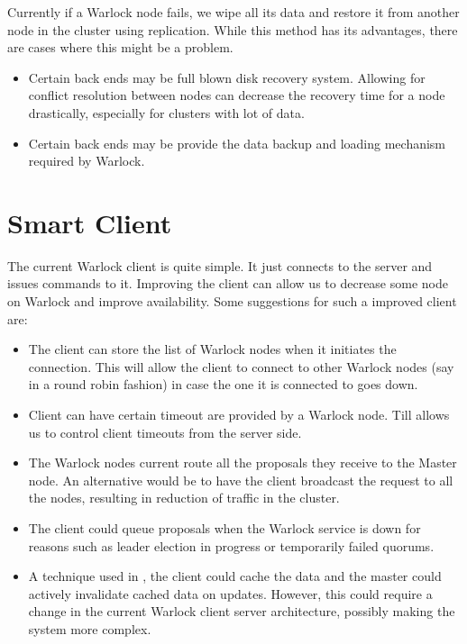 Currently if a Warlock node fails, we wipe all its data and restore it from
another node in the cluster using replication. While this method has its
advantages, there are cases where this might be a problem.

\begin{itemize}
  \item Certain back ends may be full blown disk recovery system. Allowing for
    conflict resolution between nodes can decrease the recovery time for a
    node drastically, especially for clusters with lot of data.
  \item Certain back ends may be provide the data backup and loading mechanism
    required by Warlock.
\end{itemize}

\section{Smart Client}

The current Warlock client is quite simple. It just connects to the server and
issues commands to it. Improving the client can allow us to decrease some
node on Warlock and improve availability. Some suggestions for such a improved
client are:

\begin{itemize}
  \item The client can store the list of Warlock nodes when it initiates the
    connection. This will allow the client to connect to other Warlock nodes
    (say in a round robin fashion) in case the one it is connected to goes down.
  \item Client can have certain timeout are provided by a Warlock node. Till
    allows us to control client timeouts from the server side.
  \item The Warlock nodes current route all the proposals they receive to the
    Master node. An alternative would be to have the client broadcast the
    request to all the nodes, resulting in reduction of traffic in the cluster.
  \item The client could queue proposals when the Warlock service is down for
    reasons such as leader election in progress or temporarily failed quorums.
  \item A technique used in \citet{Burrows06}, the client could cache the data
    and the master could actively invalidate cached data on updates. However,
    this could require a change in the current Warlock client server
    architecture, possibly making the system more complex.
\end{itemize}


